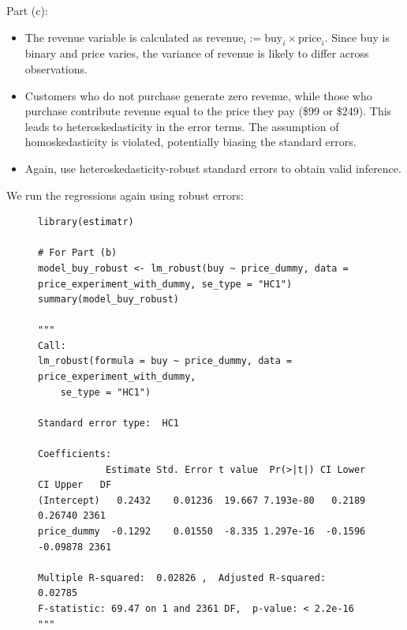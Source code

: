 \documentclass{article}
\begin{document}
Part (c):

\begin{itemize}
    \item The revenue variable is calculated as $\text{revenue}_i := \text{buy}_i \times \text{price}_i$. Since buy is binary and price varies, the variance of revenue is likely to differ across observations.
    \item Customers who do not purchase generate zero revenue, while those who purchase contribute revenue equal to the price they pay (\$99 or \$249). This leads to heteroskedasticity in the error terms. The assumption of homoskedasticity is violated, potentially biasing the standard errors.
    \item Again, use heteroskedasticity-robust standard errors to obtain valid inference.
\end{itemize}

We run the regressions again using robust errors:

\begin{figure}[H]
\centering
\begin{lstlisting}[style=Rstyle, caption=Simple Dummy Regression on Price Experiment with Robust Errors]
library(estimatr)

# For Part (b)
model_buy_robust <- lm_robust(buy ~ price_dummy, data = price_experiment_with_dummy, se_type = "HC1")
summary(model_buy_robust)

"""
Call:
lm_robust(formula = buy ~ price_dummy, data = price_experiment_with_dummy, 
    se_type = "HC1")

Standard error type:  HC1 

Coefficients:
            Estimate Std. Error t value  Pr(>|t|) CI Lower CI Upper   DF
(Intercept)   0.2432    0.01236  19.667 7.193e-80   0.2189  0.26740 2361
price_dummy  -0.1292    0.01550  -8.335 1.297e-16  -0.1596 -0.09878 2361

Multiple R-squared:  0.02826 ,	Adjusted R-squared:  0.02785 
F-statistic: 69.47 on 1 and 2361 DF,  p-value: < 2.2e-16
"""
\end{lstlisting}
\end{figure}
\end{document}
